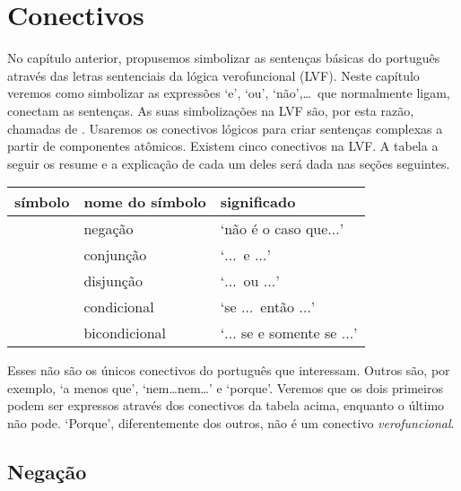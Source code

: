 \chapter{Conectivos}
\label{s:TFLConnectives}

No capítulo anterior, propusemos simbolizar as sentenças básicas do português através das letras sentenciais da lógica verofuncional (LVF).
Neste capítulo veremos como simbolizar as expressões `e', `ou', `não',\ldots\ 
que normalmente ligam, conectam as sentenças.
As suas simbolizações na LVF são, por esta razão, chamadas de .
Usaremos os conectivos lógicos para criar sentenças complexas a partir de componentes atômicos. Existem cinco conectivos na LVF.
A tabela a seguir os resume e a explicação de cada um deles será dada nas seções seguintes.

	\begin{table}[h]
	\center
	\begin{tabular}{l l l}
	
	\textbf{símbolo}&\textbf{nome do símbolo}&\textbf{significado}\\
	\hline
	\enot&negação&`não é o caso que$\ldots$'\\
	\eand&conjunção&`$\ldots$\ e $\ldots$'\\
	\eor&disjunção&`$\ldots$\ ou $\ldots$'\\
	\eif&condicional&`se $\ldots$\ então $\ldots$'\\
	\eiff&bicondicional&`$\ldots$ se e somente se $\ldots$'\\
	
	\end{tabular}
	\label{table:TFLConnectives}
	\end{table}

Esses não são os únicos conectivos do português que interessam.
Outros são, por exemplo, `a menos que', `nem\ldots{}nem\ldots' e `porque'.
Veremos que os dois primeiros podem ser expressos através dos conectivos da tabela acima, enquanto o último não pode.
`Porque', diferentemente dos outros, não é um conectivo \emph{verofuncional}.
        
\section{Negação}

